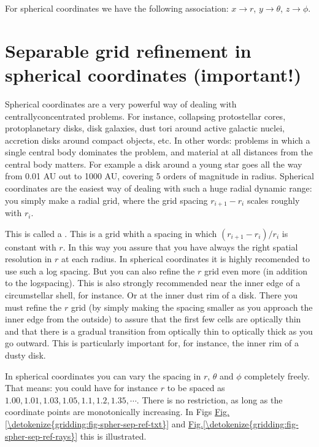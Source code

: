\documentclass[letterpaper,10pt,english]{sphinxmanual}
\begin{document}
For spherical coordinates we have the following association: \(x\rightarrow r\),
\(y\rightarrow \theta\), \(z\rightarrow \phi\).


\section{Separable grid refinement in spherical coordinates (important!)}
\label{\detokenize{gridding:separable-grid-refinement-in-spherical-coordinates-important}}\label{\detokenize{gridding:sec-separable-refinement}}
Spherical coordinates are a very powerful way of dealing with
centrally\sphinxhyphen{}concentrated problems. For instance, collapsing protostellar cores,
protoplanetary disks, disk galaxies, dust tori around active galactic nuclei,
accretion disks around compact objects, etc. In other words: problems in which a
single central body dominates the problem, and material at all distances from
the central body matters. For example a disk around a young star goes all the
way from 0.01 AU out to 1000 AU, covering 5 orders of magnitude in
radius. Spherical coordinates are the easiest way of dealing with such a huge
radial dynamic range: you simply make a radial grid, where the grid spacing
\(r_{i+1}-r_i\) scales roughly with \(r_i\).

This is called a . This is a grid whith a spacing in
which \((r_{i+1}-r_i)/r_i\) is constant with \(r\). In this way you
assure that you have always the right spatial resolution in \(r\) at each
radius. In spherical coordinates it is highly recomended to use such a log
spacing. But you can also refine the \(r\) grid even more (in addition to
the log\sphinxhyphen{}spacing). This is also strongly recommended near the inner edge of a
circumstellar shell, for instance.  Or at the inner dust rim of a disk. There
you must refine the \(r\) grid (by simply making the spacing smaller as you
approach the inner edge from the outside) to assure that the first few cells are
optically thin and that there is a gradual transition from optically thin to
optically thick as you go outward. This is particularly important for, for
instance, the inner rim of a dusty disk.

In spherical coordinates you can vary the spacing in \(r\), \(\theta\)
and \(\phi\) completely freely. That means: you could have for instance
\(r\) to be spaced as \(1.00, 1.01, 1.03, 1.05, 1.1, 1.2, 1.35,
\cdots\). There is no restriction, as long as the coordinate points are
monotonically increasing. In Figs \hyperref[\detokenize{gridding:fig-spher-sep-ref-txt}]{Fig.\@ \ref{\detokenize{gridding:fig-spher-sep-ref-txt}}} and
\hyperref[\detokenize{gridding:fig-spher-sep-ref-rays}]{Fig.\@ \ref{\detokenize{gridding:fig-spher-sep-ref-rays}}} this is illustrated.
\end{document}
